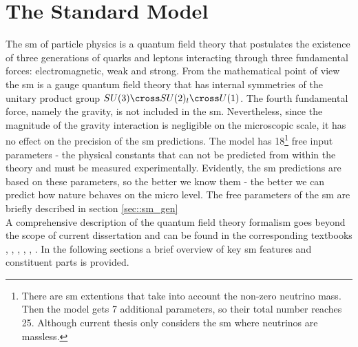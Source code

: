 \chapter{The Standard Model}
    
	The \gls{sm} of particle physics is a quantum field theory that postulates the existence of three generations of quarks and leptons interacting through three fundamental forces: electromagnetic, weak and strong. From the mathematical point of view the \gls{sm} is a gauge quantum field theory that has internal symmetries of the unitary product group $SU(3)\cross SU(2)_l \cross U(1)$.  The fourth fundamental force, namely the gravity, is not included in the \gls{sm}. Nevertheless, since the magnitude of the gravity interaction is negligible on the microscopic scale, it has no effect on the precision of the \gls{sm} predictions. The model has 18\footnote{There are \gls{sm} extentions that take into account the non-zero neutrino mass. Then the model gets 7 additional parameters, so their total number reaches 25. Although current thesis only considers the \gls{sm} where neutrinos are massless.} free input parameters - the physical constants that can not be predicted from within the theory and must be measured experimentally. Evidently, the \gls{sm} predictions are based on these parameters, so the better we know them - the better we can predict how nature behaves on the micro level. The free parameters of the \gls{sm} are briefly described in section \ref{sec::sm_gen}\\

	A comprehensive description of the quantum field theory formalism goes beyond the scope of current dissertation and can be found in the corresponding textbooks \cite{Peskin}, \cite{bogol}, \cite{Srednicki}, \cite{Berest}, \cite{weinberg}, \cite{Griffiths}. In the following sections a brief overview of key \gls{sm} features and constituent parts is provided. \\        
